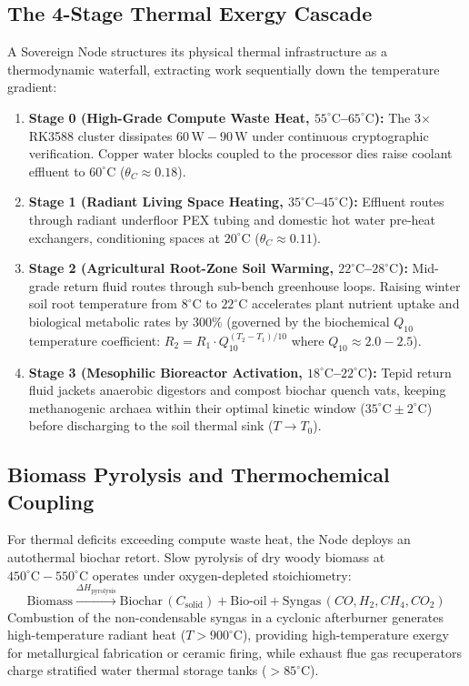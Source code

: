 \subsection{The 4-Stage Thermal Exergy Cascade}

A Sovereign Node structures its physical thermal infrastructure as a thermodynamic waterfall, extracting work sequentially down the temperature gradient:
\begin{enumerate}
    \item \textbf{Stage 0 (High-Grade Compute Waste Heat, $55^\circ\mathrm{C}$--$65^\circ\mathrm{C}$):} The 3$\times$ RK3588 cluster dissipates $60\,\mathrm{W}-90\,\mathrm{W}$ under continuous cryptographic verification. Copper water blocks coupled to the processor dies raise coolant effluent to $60^\circ\mathrm{C}$ ($\theta_C \approx 0.18$).
    \item \textbf{Stage 1 (Radiant Living Space Heating, $35^\circ\mathrm{C}$--$45^\circ\mathrm{C}$):} Effluent routes through radiant underfloor PEX tubing and domestic hot water pre-heat exchangers, conditioning spaces at $20^\circ\mathrm{C}$ ($\theta_C \approx 0.11$).
    \item \textbf{Stage 2 (Agricultural Root-Zone Soil Warming, $22^\circ\mathrm{C}$--$28^\circ\mathrm{C}$):} Mid-grade return fluid routes through sub-bench greenhouse loops. Raising winter soil root temperature from $8^\circ\mathrm{C}$ to $22^\circ\mathrm{C}$ accelerates plant nutrient uptake and biological metabolic rates by $300\%$ (governed by the biochemical $Q_{10}$ temperature coefficient: $R_2 = R_1 \cdot Q_{10}^{(T_2 - T_1)/10}$ where $Q_{10} \approx 2.0 - 2.5$).
    \item \textbf{Stage 3 (Mesophilic Bioreactor Activation, $18^\circ\mathrm{C}$--$22^\circ\mathrm{C}$):} Tepid return fluid jackets anaerobic digestors and compost biochar quench vats, keeping methanogenic archaea within their optimal kinetic window ($35^\circ\mathrm{C} \pm 2^\circ\mathrm{C}$) before discharging to the soil thermal sink ($T \to T_0$).
\end{enumerate}

\subsection{Biomass Pyrolysis and Thermochemical Coupling}

For thermal deficits exceeding compute waste heat, the Node deploys an autothermal biochar retort. Slow pyrolysis of dry woody biomass at $450^\circ\mathrm{C}-550^\circ\mathrm{C}$ operates under oxygen-depleted stoichiometry:
\begin{equation}
\mathrm{Biomass} \stackrel{\Delta H_{\mathrm{pyrolysis}}}{\longrightarrow} \mathrm{Biochar} \, (C_{\mathrm{solid}}) + \mathrm{Bio\mbox{-}oil} + \mathrm{Syngas} \, (CO, H_2, CH_4, CO_2)
\end{equation}
Combustion of the non-condensable syngas in a cyclonic afterburner generates high-temperature radiant heat ($T > 900^\circ\mathrm{C}$), providing high-temperature exergy for metallurgical fabrication or ceramic firing, while exhaust flue gas recuperators charge stratified water thermal storage tanks ($>85^\circ\mathrm{C}$).

